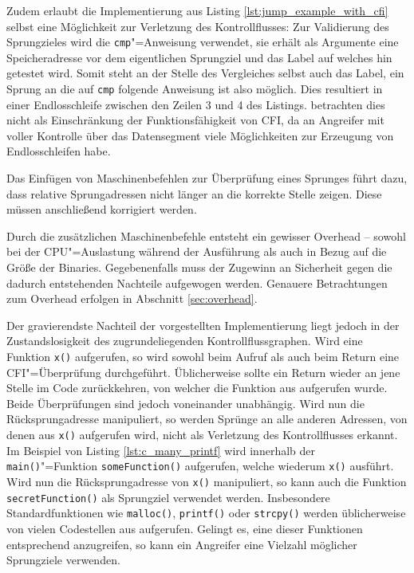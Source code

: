 Zudem erlaubt die Implementierung aus Listing \ref{lst:jump_example_with_cfi} selbst eine Möglichkeit zur Verletzung des Kontrollflusses: Zur Validierung des Sprungzieles wird die \texttt{cmp}"=Anweisung verwendet, sie erhält als Argumente eine Speicheradresse vor dem eigentlichen Sprungziel und das Label auf welches hin getestet wird. Somit steht an der Stelle des Vergleiches selbst auch das Label, ein Sprung an die auf \texttt{cmp} folgende Anweisung ist also möglich. Dies resultiert in einer Endlosschleife zwischen den Zeilen 3 und 4 des Listings. \cite{Abadi.2009} betrachten dies nicht als Einschränkung der Funktionsfähigkeit von CFI, da an Angreifer mit voller Kontrolle über das Datensegment viele Möglichkeiten zur Erzeugung von Endlosschleifen habe.

Das Einfügen von Maschinenbefehlen zur Überprüfung eines Sprunges führt dazu, dass relative Sprungadressen nicht länger an die korrekte Stelle zeigen. Diese müssen anschließend korrigiert werden.

Durch die zusätzlichen Maschinenbefehle entsteht ein gewisser Overhead -- sowohl bei der CPU"=Auslastung während der Ausführung als auch in Bezug auf die Größe der Binaries. Gegebenenfalls muss der Zugewinn an Sicherheit gegen die dadurch entstehenden Nachteile aufgewogen werden. Genauere Betrachtungen zum Overhead erfolgen in Abschnitt \ref{sec:overhead}.

Der gravierendste Nachteil der vorgestellten Implementierung liegt jedoch in der Zustandslosigkeit des zugrundeliegenden Kontrollflussgraphen. Wird eine Funktion \texttt{x()} aufgerufen, so wird sowohl beim Aufruf als auch beim Return eine CFI"=Überprüfung durchgeführt. Üblicherweise sollte ein Return wieder an jene Stelle im Code zurückkehren, von welcher die Funktion aus aufgerufen wurde. Beide Überprüfungen sind jedoch voneinander unabhängig. Wird nun die Rücksprungadresse manipuliert, so werden Sprünge an alle anderen Adressen, von denen aus \texttt{x()} aufgerufen wird, nicht als Verletzung des Kontrollflusses erkannt. Im Beispiel von Listing \ref{lst:c_many_printf} wird innerhalb der \texttt{main()}"=Funktion \texttt{someFunction()} aufgerufen, welche wiederum \texttt{x()} ausführt. Wird nun die Rücksprungadresse von \texttt{x()} manipuliert, so kann auch die Funktion \texttt{secretFunction()} als Sprungziel verwendet werden. Insbesondere Standardfunktionen wie \texttt{malloc()}, \texttt{printf()} oder \texttt{strcpy()} werden üblicherweise von vielen Codestellen aus aufgerufen. Gelingt es, eine dieser Funktionen entsprechend anzugreifen, so kann ein Angreifer eine Vielzahl möglicher Sprungziele verwenden.


